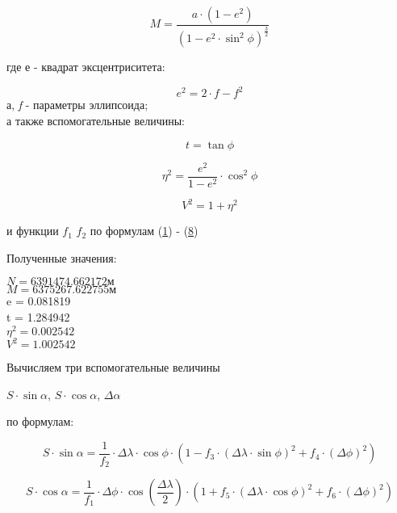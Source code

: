 \documentclass[a4paper,14pt]{article}
\newcommand\indent[1][1cm]{\hspace*{#1}}
\begin{document}
\begin{equation}
    M = \frac{a \cdot (1 - e^2)}{(1 - e^2 \cdot \sin^2{\phi})^\frac{3}{2}}
\end{equation}

где е - квадрат эксцентриситета:

\begin{equation}
    e^2 = 2 \cdot f - f^2
\end{equation}
а, \textit{f} - параметры эллипсоида;\\
а также вспомогательные величины:

\begin{equation}
    t = \tan{\phi}
\end{equation}

\begin{equation}
    \eta^2 = \frac{e^2}{1 - e^2} \cdot \cos^2{\phi}
\end{equation}

\begin{equation}
    V^2 = 1 + \eta^2
\end{equation}

\indent и функции \textit{$f_1$} \textit{$f_2$} по формулам (\hyperlink{f_1}{1}) - (\hyperlink{f_8}{8})

\indent Полученные значения:
\begin{center}
    $N = 6391474.662172 \textit{м}$\\
    $M = 6375267.622755 \textit{м}$\\
    e = 0.081819\\
    t = 1.284942\\
    $\eta^2 = 0.002542$\\
    $V^2 = 1.002542$\\
\end{center}

\indent Вычисляем три вспомогательные величины

\begin{center}
    $S \cdot \sin{\alpha}$, $S \cdot \cos{\alpha}$, $\Delta\alpha$
\end{center}

по формулам:

\begin{equation}
    S \cdot \sin{\alpha} = \frac{1}{f_2} \cdot \Delta\lambda \cdot \cos{\phi} \cdot \left(1 - f_3 \cdot (\Delta\lambda \cdot \sin{\phi})^2 + f_4 \cdot (\Delta\phi)^2 \right) 
\end{equation}

\begin{equation}
    S \cdot \cos{\alpha} = \frac{1}{f_1} \cdot \Delta\phi \cdot \cos{\left(\frac{\Delta\lambda}{2}\right)} \cdot \left(1 + f_5 \cdot (\Delta\lambda \cdot \cos{\phi})^2 + f_6 \cdot (\Delta\phi)^2 \right)
\end{equation}
\end{document}
